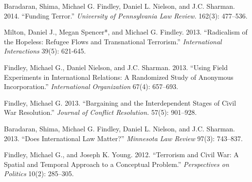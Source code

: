 \documentclass[10pt]{article}
\begin{document}
\begin{etaremune}
\item Baradaran, Shima, Michael G. Findley, Daniel L. Nielson, and J.C. Sharman. 2014. ``Funding Terror.''  \textit{University of Pennsylvania Law Review}. 162(3): 477--536.



\item Milton, Daniel J., Megan Spencer*, and Michael G. Findley. 2013. ``Radicalism of the Hopeless: Refugee Flows and Transnational Terrorism.'' \textit{International Interactions} 39(5): 621-645.



\item Findley, Michael G., Daniel Nielson, and J.C. Sharman. 2013. ``Using Field Experiments in International Relations: A Randomized Study of Anonymous Incorporation.'' \textit{International Organization} 67(4): 657--693. 



\item Findley, Michael G. 2013. ``Bargaining and the Interdependent Stages of Civil War Resolution.'' \textit{Journal of Conflict Resolution.} 57(5): 901--928.


\item Baradaran, Shima, Michael G. Findley, Daniel L. Nielson, and J.C. Sharman. 2013. ``Does International Law Matter?'' \textit{Minnesota Law Review} 97(3): 743--837. 


\item Findley, Michael G., and Joseph K. Young. 2012.  ``Terrorism and Civil War: A Spatial and Temporal Approach to a Conceptual Problem.'' \textit{Perspectives on Politics} 10(2): 285--305.




\end{etaremune}
\end{document}
